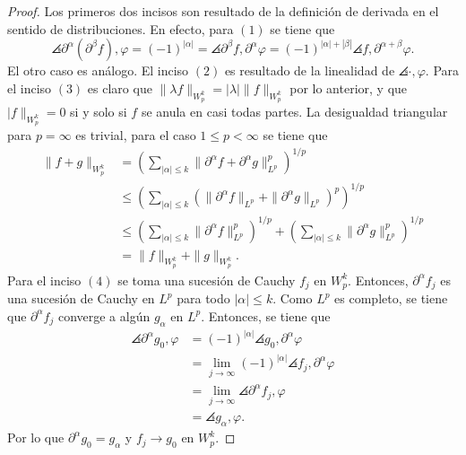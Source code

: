 \begin{proof}
	Los primeros dos incisos son resultado de la definición de derivada en el sentido de distribuciones. En efecto, para $(1)$ se tiene que 
	\begin{equation*}
		\angles{\partial^\alpha(\partial^\beta f), \varphi} = 
		(-1)^{|\alpha|} = \angles{\partial^\beta f, \partial^\alpha\varphi} =
		(-1)^{|\alpha| + |\beta|} \angles{f, \partial^{\alpha+\beta}\varphi}. 
	\end{equation*}
	El otro caso es análogo. El inciso $(2)$ es resultado de la linealidad de $\angles{\cdot, \varphi}$.  Para el inciso $(3)$ es claro que $\|\lambda f\|_{W^k_p} = |\lambda|\|f\|_{W^k_p}$ por lo anterior, y que $|f\|_{W^k_p} = 0$ si y solo si $f$ se anula en casi todas partes. La desigualdad triangular para $p=\infty$ es trivial, para el caso $1\leq p<\infty$ se tiene que 
	\begin{align*}
		\|f+g\|_{W^k_p} &= \left(\sum_{|\alpha|\leq k} \|\partial^\alpha f + \partial^\alpha g\|_{L^p}^p
		\right)^{1/p} \\ 
		& \leq \left(\sum_{|\alpha|\leq k} (\|\partial^\alpha f\|_{L^p} +  \|\partial^\alpha g\|_{L^p})^p
		\right)^{1/p} \\
		& \leq \left(\sum_{|\alpha|\leq k} \|\partial^\alpha f\|_{L^p}^p
		\right)^{1/p} + \left(\sum_{|\alpha|\leq k} \|\partial^\alpha g\|_{L^p}^p
		\right)^{1/p} \\
		& = \|f\|_{W^k_p} + \|g\|_{W^k_p}.
	\end{align*}
	Para el inciso $(4)$ se toma una sucesión de Cauchy $f_j$ en $W^k_p$. Entonces, $\partial^\alpha f_j$ es una sucesión de Cauchy en $L^p$ para todo $|\alpha|\leq k$. Como $L^p$ es completo, se tiene que $\partial^\alpha f_j$ converge a algún $g_\alpha$ en $L^p$. Entonces, se tiene que
	\begin{align*}
		\angles{\partial^\alpha g_0, \varphi}& = (-1)^{|\alpha|}  \angles{g_0, \partial^\alpha \varphi} \\
		& = \lim_{j\rightarrow\infty}(-1)^{|\alpha|} \angles{f_j, \partial^\alpha \varphi} \\
		& =  \lim_{j\rightarrow\infty}\angles{\partial^\alpha f_j, \varphi} \\
		& = \angles{g_\alpha, \varphi}.
	\end{align*} 
	Por lo que $\partial^\alpha g_0 = g_\alpha$ y $f_j \rightarrow g_0$ en $W^k_p$.
\end{proof}

